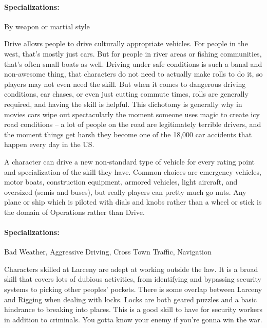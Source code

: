 \paragraph{Specializations:} By weapon or martial style


\hspace{\parindent} Drive allows people to drive culturally appropriate vehicles. For people in the west, that's mostly just cars. But for people in river areas or fishing communities, that's often small boats as well. Driving under safe conditions is such a banal and non-awesome thing, that characters do not need to actually make rolls to do it, so players may not even need the skill. But when it comes to dangerous driving conditions, car chases, or even just cutting commute times, rolls are generally required, and having the skill is helpful. This dichotomy is generally why in movies cars wipe out spectacularly the moment someone uses magic to create icy road conditions -- a lot of people on the road are legitimately terrible drivers, and the moment things get harsh they become one of the 18,000 car accidents that happen every day in the US. 

A character can drive a new non-standard type of vehicle for every rating point and specialization of the skill they have. Common choices are emergency vehicles, motor boats, construction equipment, armored vehicles, light aircraft, and oversized (semis and buses), but really players can pretty much go nuts. Any plane or ship which is piloted with dials and knobs rather than a wheel or stick is the domain of Operations rather than Drive.

\paragraph{Specializations:} Bad Weather, Aggressive Driving, Cross Town Traffic, Navigation


\hspace{\parindent} Characters skilled at Larceny are adept at working outside the law. It is a broad skill that covers lots of dubious activities, from identifying and bypassing security systems to picking other peoples' pockets. There is some overlap between Larceny and Rigging when dealing with locks. Locks are both geared puzzles and a basic hindrance to breaking into places. This is a good skill to have for security workers in addition to criminals. You gotta know your enemy if you're gonna win the war. 

